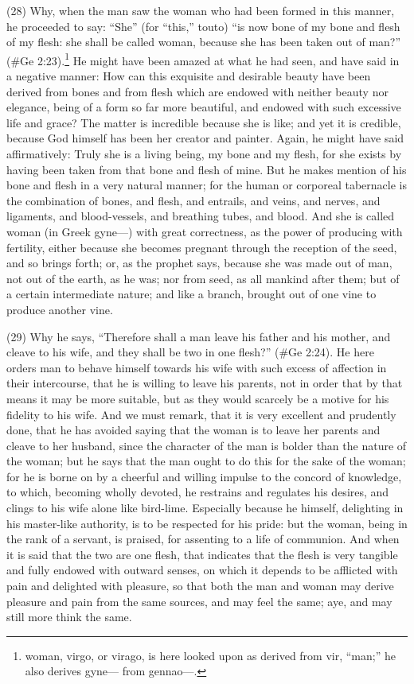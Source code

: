 (28) Why, when the man saw the woman who had been formed in this manner, he proceeded to
say: ``She'' (for ``this,'' touto) ``is now bone of my bone and flesh of my flesh: she shall be called
woman, because she has been taken out of man?'' (\#Ge 2:23).\footnote{woman, virgo, or virago, is here
looked upon as derived from vir, ``man;'' he also derives gyne— from gennao—.} He might have been amazed at
what he had seen, and have said in a negative manner: How can this exquisite and desirable
beauty have been derived from bones and from flesh which are endowed with neither beauty nor
elegance, being of a form so far more beautiful, and endowed with such excessive life and grace?
The matter is incredible because she is like; and yet it is credible, because God himself has been
her creator and painter. Again, he might have said affirmatively: Truly she is a living being, my bone
and my flesh, for she exists by having been taken from that bone and flesh of mine. But he makes
mention of his bone and flesh in a very natural manner; for the human or corporeal tabernacle is
the combination of bones, and flesh, and entrails, and veins, and nerves, and ligaments, and
blood-vessels, and breathing tubes, and blood. And she is called woman (in Greek gyne—) with
great correctness, as the power of producing with fertility, either because she becomes pregnant
through the reception of the seed, and so brings forth; or, as the prophet says, because she was
made out of man, not out of the earth, as he was; nor from seed, as all mankind after them; but of a
certain intermediate nature; and like a branch, brought out of one vine to produce another vine.

(29) Why he says, ``Therefore shall a man leave his father and his mother, and cleave to his wife,
and they shall be two in one flesh?'' (\#Ge 2:24). He here orders man to behave himself
towards his wife with such excess of affection in their intercourse, that he is willing to leave his
parents, not in order that by that means it may be more suitable, but as they would scarcely be a
motive for his fidelity to his wife. And we must remark, that it is very excellent and prudently done,
that he has avoided saying that the woman is to leave her parents and cleave to her husband,
since the character of the man is bolder than the nature of the woman; but he says that the man
ought to do this for the sake of the woman; for he is borne on by a cheerful and willing impulse to
the concord of knowledge, to which, becoming wholly devoted, he restrains and regulates his
desires, and clings to his wife alone like bird-lime. Especially because he himself, delighting in his
master-like authority, is to be respected for his pride: but the woman, being in the rank of a servant,
is praised, for assenting to a life of communion. And when it is said that the two are one flesh, that
indicates that the flesh is very tangible and fully endowed with outward senses, on which it depends
to be afflicted with pain and delighted with pleasure, so that both the man and woman may derive
pleasure and pain from the same sources, and may feel the same; aye, and may still more think
the same.

